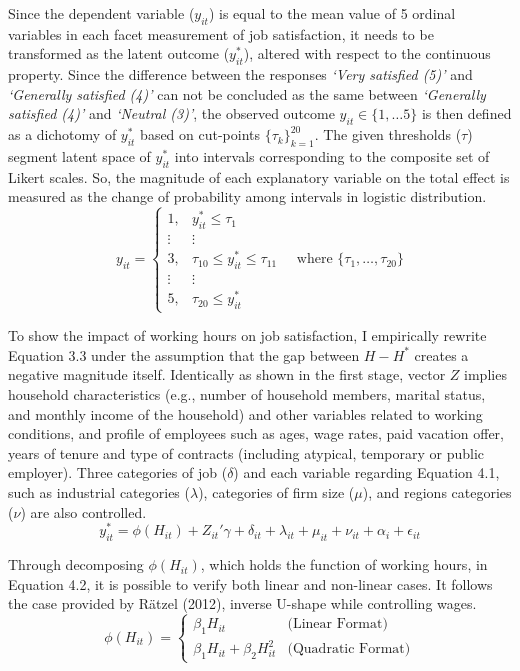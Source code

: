 \documentclass[
  12pt,
]{article}
\begin{document}
Since the dependent variable (\(y_{it}\)) is equal to the mean value of
5 ordinal variables in each facet measurement of job satisfaction, it
needs to be transformed as the latent outcome (\(y^*_{it}\)), altered
with respect to the continuous property. Since the difference between
the responses \emph{`Very satisfied (5)'} and \emph{`Generally satisfied
(4)'} can not be concluded as the same between \emph{`Generally
satisfied (4)'} and \emph{`Neutral (3)'}, the observed outcome
\(y_{it} \in \{1, \dots 5\}\) is then defined as a dichotomy of
\(y^*_{it}\) based on cut-points \(\{\tau_k\}_{k=1}^{20}\). The given
thresholds (\(\tau\)) segment latent space of \(y^*_{it}\) into
intervals corresponding to the composite set of Likert scales. So, the
magnitude of each explanatory variable on the total effect is measured
as the change of probability among intervals in logistic distribution.
\[
y_{it} =
\begin{cases}
1, & y^*_{it} \leq \tau_1 \\
\vdots & \vdots \\
3, & \tau_{10} \leq y^*_{it} \leq \tau_{11} \\
\vdots & \vdots \\
5, & \tau_{20} \leq y^*_{it}
\end{cases}\quad
\text{where } \{\tau_1, \dots, \tau_{20}\}
\]

To show the impact of working hours on job satisfaction, I empirically
rewrite Equation 3.3 under the assumption that the gap between \(H-H^*\)
creates a negative magnitude itself. Identically as shown in the first
stage, vector \(Z\) implies household characteristics (e.g., number of
household members, marital status, and monthly income of the household)
and other variables related to working conditions, and profile of
employees such as ages, wage rates, paid vacation offer, years of tenure
and type of contracts (including atypical, temporary or public
employer). Three categories of job (\(\delta\)) and each variable
regarding Equation 4.1, such as industrial categories (\(\lambda\)),
categories of firm size (\(\mu\)), and regions categories (\(\nu\)) are
also controlled. \[
y^*_{it} = \phi(H_{it}) + Z_{it}' \gamma + \delta_{it} + \lambda_{it} + \mu_{it} + \nu_{it} +\alpha_i + \epsilon_{it}
\tag{4.4}
\]

Through decomposing \(\phi(H_{it})\), which holds the function of
working hours, in Equation 4.2, it is possible to verify both linear and
non-linear cases. It follows the case provided by Rätzel (2012), inverse
U-shape while controlling wages. \[
\phi(H_{it}) =
\begin{cases} 
\beta_1 H_{it} & \text{(Linear Format)} \\
\beta_1 H_{it} + \beta_2 H_{it}^2 & \text{(Quadratic Format)}
\end{cases}
\]
\end{document}
